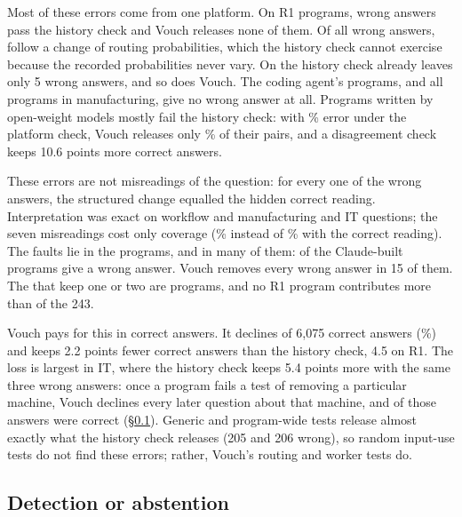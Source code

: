 Most of these errors come from one platform. On \otf R1 programs, \rOtfHistWrong{} wrong answers pass the history check and Vouch releases none of them. Of all \rNoCheckWrongClaude{} wrong answers, \rRouteProbWrong{} follow a change of routing probabilities, which the history check cannot exercise because the recorded probabilities never vary. On \devs the history check already leaves only 5 wrong answers, and so does Vouch. The coding agent's programs, and all programs in manufacturing, give no wrong answer at all. Programs written by open-weight models mostly fail the history check: with \rNoCheckErrOllama\% error under the platform check, Vouch releases only \rGateCovOllama\% of their pairs, and a disagreement check keeps 10.6 points more correct answers.

These errors are not misreadings of the question: for every one of the \rNoCheckWrongClaude{} wrong answers, the structured change equalled the hidden correct reading. Interpretation was exact on \rInterpWf{} workflow and \rInterpMl{} manufacturing and IT questions; the seven misreadings cost only coverage (\rMlCovInterp\% instead of \rMlCovOracle\% with the correct reading). The faults lie in the programs, and in many of them: \rProgsWithWrong{} of the \rProgsClaude{} Claude-built programs give a wrong answer. Vouch removes every wrong answer in 15 of them. The \rProgsWrongKept{} that keep one or two are \devs programs, and no \otf R1 program contributes more than \rOtfLargestProgWrong{} of the 243.

Vouch pays for this in correct answers. It declines \rRightLostCountClaude{} of 6{,}075 correct answers (\rRightLostClaude\%) and keeps 2.2 points fewer correct answers than the history check, 4.5 on \otf R1. The loss is largest in IT, where the history check keeps 5.4 points more with the same three wrong answers: once a program fails a test of removing a particular machine, Vouch declines every later question about that machine, and \rItAlreadyRight{} of those answers were correct (\S\ref{sec:results:families}). Generic and program-wide tests release almost exactly what the history check releases (205 and 206 wrong), so random input-use tests do not find these errors; rather, Vouch's routing and worker tests do.

\subsection{Detection or abstention}
\label{sec:results:families}


